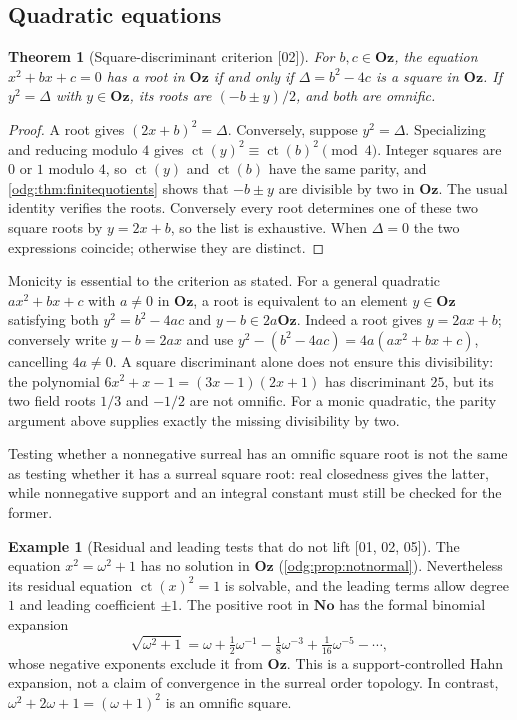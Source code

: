 \documentclass[11pt,oneside]{article}
\numberwithin{equation}{section}
\newtheorem{theorem}{Theorem}[section]
\theoremstyle{definition}
\newtheorem{example}[example]{Example}
\theoremstyle{remark}
\newcommand{\No}{\mathbf{No}}
\newcommand{\Oz}{\mathbf{Oz}}
\newcommand{\ct}{\operatorname{ct}}
\newcommand{\src}[1]{\textup{\textsf{\small[#1]}}}
\begin{document}
\subsection{Quadratic equations}

\begin{theorem}[Square-discriminant criterion \src{02}]\label{odg:thm:quadraticformula}
For $b,c\in\Oz$, the equation $x^2+bx+c=0$ has a root in $\Oz$ if and only
if $\Delta=b^2-4c$ is a square in $\Oz$. If $y^2=\Delta$ with $y\in\Oz$, its
roots are $(-b\pm y)/2$, and both are omnific.
\end{theorem}
\begin{proof}
A root gives $(2x+b)^2=\Delta$. Conversely, suppose $y^2=\Delta$.
Specializing and reducing modulo $4$ gives $\ct(y)^2\equiv\ct(b)^2\pmod4$.
Integer squares are $0$ or $1$ modulo $4$, so $\ct(y)$ and $\ct(b)$ have the
same parity, and \cref{odg:thm:finitequotients} shows that $-b\pm y$ are
divisible by two in $\Oz$. The usual identity verifies the roots.
Conversely every root determines one of these two square roots by $y=2x+b$,
so the list is exhaustive. When $\Delta=0$ the two expressions coincide;
otherwise they are distinct.
\end{proof}

Monicity is essential to the criterion as stated. For a general quadratic
$ax^2+bx+c$ with $a\ne0$ in $\Oz$, a root is equivalent to an element
$y\in\Oz$ satisfying both $y^2=b^2-4ac$ and $y-b\in2a\Oz$.
Indeed a root gives $y=2ax+b$; conversely write $y-b=2ax$ and use
$y^2-(b^2-4ac)=4a(ax^2+bx+c)$, cancelling $4a\ne0$.
A square discriminant alone does not ensure this divisibility: the
polynomial $6x^2+x-1=(3x-1)(2x+1)$ has discriminant $25$, but its two field
roots $1/3$ and $-1/2$ are not omnific. For a monic quadratic, the parity
argument above supplies exactly the missing divisibility by two.

Testing whether a nonnegative surreal has an omnific square root is not the
same as testing whether it has a surreal square root: real closedness gives
the latter, while nonnegative support and an integral constant must still be
checked for the former.

\begin{example}[Residual and leading tests that do not lift \src{01, 02, 05}]\label{odg:ex:nonsquare}
The equation $x^2=\omega^2+1$ has no solution in $\Oz$
(\cref{odg:prop:notnormal}). Nevertheless its residual equation
$\ct(x)^2=1$ is solvable, and the leading terms allow degree $1$ and leading
coefficient $\pm1$. The positive root in $\No$ has the formal binomial
expansion
\[
 \sqrt{\omega^2+1}
 =\omega+\tfrac12\omega^{-1}-\tfrac18\omega^{-3}
   +\tfrac1{16}\omega^{-5}-\cdots,
\]
whose negative exponents exclude it from $\Oz$. This is a support-controlled
Hahn expansion, not a claim of convergence in the surreal order topology. In
contrast, $\omega^2+2\omega+1=(\omega+1)^2$ is an omnific square.
\end{example}
\end{document}
